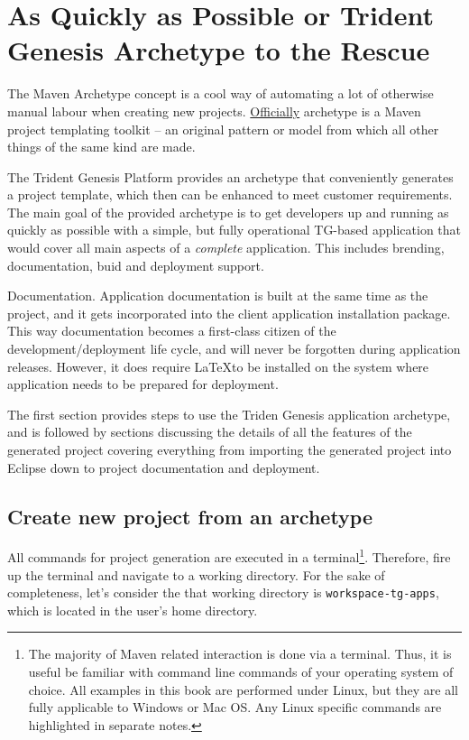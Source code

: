 \chapter{As Quickly as Possible or Trident Genesis Archetype to the Rescue}\label{ch00:02}

  The Maven Archetype concept is a cool way of automating a lot of otherwise manual labour when creating new projects.
  \href{http://maven.apache.org/guides/introduction/introduction-to-archetypes.html}{Officially} archetype is a Maven project templating toolkit -- an original pattern or model from which all other things of the same kind are made.

  The Trident Genesis Platform provides an archetype that conveniently generates a project template, which then can be enhanced to meet customer requirements.
  The main goal of the provided archetype is to get developers up and running as quickly as possible with a simple, but fully operational TG-based application that would cover all main aspects of a \emph{complete} application.
  This includes brending, documentation, buid and deployment support.
  
  \begin{notebox}{Documentation.}{\label{mb:documentation-during-build}}
    Application documentation is built at the same time as the project, and it gets incorporated into the client application installation package.
    This way documentation becomes a first-class citizen of the development/deployment life cycle, and will never be forgotten during application releases.
    However, it does require \LaTeX to be installed on the system where application needs to be prepared for deployment.
  \end{notebox}

  The first section provides steps to use the Triden Genesis application archetype, and is followed by sections discussing the details of all the features of the generated project covering everything from importing the generated project into Eclipse down to project documentation and deployment.

\section{Create new project from an archetype}

  All commands for project generation are executed in a terminal\footnote{The majority of Maven related interaction is done via a terminal.
  Thus, it is useful be familiar with command line commands of your operating system of choice.
  All examples in this book are performed under Linux, but they are all fully applicable to Windows or Mac OS.
  Any Linux specific commands are highlighted in separate notes.}.
  Therefore, fire up the terminal and navigate to a working directory.
  For the sake of completeness, let's consider the that working directory is \texttt{workspace-tg-apps}, which is located in the user's home directory.
  
